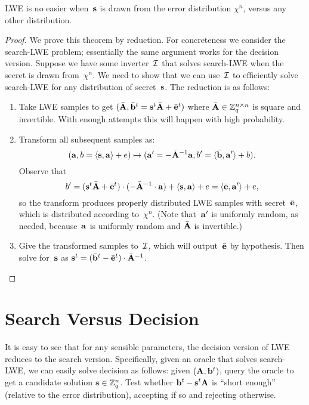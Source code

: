 \documentclass[11pt]{article}
\begin{document}
\begin{theorem}
  LWE is no easier when~$\mathbf{s}$ is drawn from the error distribution
  $\chi^n$, versus any other distribution.
\end{theorem}

\begin{proof}
  We prove this theorem by reduction. For concreteness we consider the
  search-LWE problem; essentially the same argument works for the
  decision version. Suppose we have some inverter~$\mathcal{I}$ that solves
  search-LWE when the secret is drawn from~$\chi^n$. We need to show
  that we can use~$\mathcal{I}$ to efficiently solve search-LWE for any
  distribution of secret~$\mathbf{s}$. The reduction is as follows:
  \begin{enumerate}
  \item Take LWE samples to get
    $(\bar{\mathbf{A}}, \bar{\mathbf{b}}^t = \mathbf{s}^t\bar{\mathbf{A}} +
    \bar{\mathbf{e}}^t)$ where $\bar{\mathbf{A}} \in \mathbb{Z}_q^{n\times n}$ is square
    and invertible. With enough attempts this will happen with high
    probability.

  \item Transform all subsequent samples as:
    \[ (\mathbf{a}, b = \langle\mathbf{s},\mathbf{a}\rangle+e) \mapsto (\mathbf{a}' =
      -\bar{\mathbf{A}}^{-1} \mathbf{a}, b' = \langle\bar{\mathbf{b}},\mathbf{a}'\rangle + b) . \]
    Observe that
    \[ 
      b' = (\mathbf{s}^t \bar{\mathbf{A}} + \bar{\mathbf{e}}^{t}) \cdot
      (-\bar{\mathbf{A}}^{-1} \cdot \mathbf{a}) + \langle\mathbf{s},\mathbf{a}\rangle + e =
      \langle\bar{\mathbf{e}},\mathbf{a}'\rangle + e ,
    \]
    so the transform produces properly distributed LWE samples with
    secret~$\bar{\mathbf{e}}$, which is distributed according
    to~$\chi^{n}$. (Note that~$\mathbf{a}'$ is uniformly random, as needed,
    because~$\mathbf{a}$ is uniformly random and $\bar{\mathbf{A}}$ is
    invertible.)

  \item Give the transformed samples to~$\mathcal{I}$, which will
    output~$\bar{\mathbf{e}}$ by hypothesis. Then solve for~$\mathbf{s}$ as
    $\mathbf{s}^{t} = (\bar{\mathbf{b}}^{t} - \bar{\mathbf{e}}^{t}) \cdot
    \bar{\mathbf{A}}^{-1}$.
  \end{enumerate}
\end{proof}
 
\section{Search Versus Decision}
\label{sec:search-decision}

It is easy to see that for any sensible parameters, the decision
version of LWE reduces to the search version. Specifically, given an
oracle that solves search-LWE, we can easily solve decision as
follows: given $(\mathbf{A}, \mathbf{b}^{t})$, query the oracle to get a
candidate solution $\mathbf{s} \in \mathbb{Z}_q^{n}$. Test whether
$\mathbf{b}^{t} - \mathbf{s}^{t} \mathbf{A}$ is ``short enough'' (relative to the
error distribution), accepting if so and rejecting otherwise.
\end{document}
